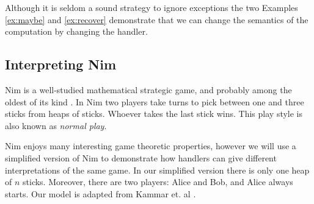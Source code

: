 Although it is seldom a sound strategy to ignore exceptions the two Examples \ref{ex:maybe} and \ref{ex:recover} demonstrate that we can change the semantics of the computation by changing the handler.

\subsection{Interpreting Nim}
Nim is a well-studied mathematical strategic game, and probably among the oldest of its kind \cite{Joergensen2009}. In Nim two players take turns to pick between one and three sticks from heaps of sticks. Whoever takes the last stick wins. This play style is also known as \emph{normal play}. 

Nim enjoys many interesting game theoretic properties, however we will use a simplified version of Nim to demonstrate how handlers can give different interpretations of the same game. In our simplified version there is only one heap of $n$ sticks. Moreover, there are two players: Alice and Bob, and Alice always starts. Our model is adapted from Kammar et. al \cite{Kammar2013}.

